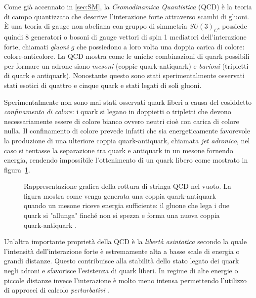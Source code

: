     Come già accennato in \ref{sec:SM}, la \textit{Cromodinamica Quantistica} (QCD) è la teoria di campo quantizzato che descrive l'interazione forte attraverso scambi di gluoni. È una teoria di gauge non abeliana con gruppo di simmetria $SU(3)_C$, possiede quindi 8 generatori o bosoni di gauge vettori di spin 1 mediatori dell'interazione forte, chiamati \textit{gluoni} $g$ che possiedono a loro volta una doppia carica di colore: colore-anticolore. La QCD mostra come le uniche combinazioni di quark possibili per formare un adrone siano \textit{mesoni} (coppie quark-antiquark) e \textit{barioni} (tripletti di quark e antiquark). Nonostante questo sono stati sperimentalmente osservati stati esotici di quattro e cinque quark e stati legati di soli gluoni.

    Sperimentalmente non sono mai stati osservati quark liberi a causa del cosiddetto \textit{confinamento di colore}: i quark si legano in doppietti o tripletti che devono necessariamente essere di colore bianco ovvero neutri cioè con carica di colore nulla. Il confinamento di colore prevede infatti che sia energeticamente favorevole la produzione di una ulteriore coppia quark-antiquark, chiamata \textit{jet adronico}, nel caso si tentasse la separazione tra quark e antiquark in un mesone fornendo energia, rendendo impossibile l'ottenimento di un quark libero come mostrato in figura~\ref{fig:2-hadron-jet}.

    \begin{figure}[t]
        \centering
        
        \caption{Rappresentazione grafica della rottura di stringa QCD nel vuoto. La figura mostra come venga generata una coppia quark-antiquark quando un mesone riceve energia sufficiente: il gluone che lega i due quark si "allunga" finché non si spezza e forma una nuova coppia quark-antiquark \cite{Wikimedia_Quark_Confinement}.}
        \label{fig:2-hadron-jet}
    \end{figure}

    Un'altra importante proprietà della QCD è la \textit{libertà asintotica} secondo la quale l'intensità dell'interazione forte è estremamente alta a basse scale di energia o grandi distanze. Questo contribuisce alla stabilità dello stato legato dei quark negli adroni e sfavorisce l'esistenza di quark liberi. In regime di alte energie o piccole distanze invece l'interazione è molto meno intensa permettendo l'utilizzo di approcci di calcolo \textit{perturbativi} \cite{BGS_2012}.

